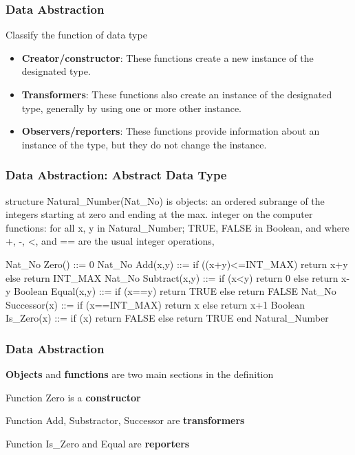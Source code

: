 \documentclass[newPxFont,sthlmFooter,nooffset]{beamer}
\begin{document}
\begin{frame}[t]
	\frametitle{Data Abstraction}
	Classify the function of data type 
	\begin{itemize}
		\item\textbf{Creator/constructor}: These functions create a new instance of the designated type.
		\item\textbf{Transformers}: These functions also create an instance of the designated type, generally by using one or more other instance.
		\item\textbf{Observers/reporters}: These functions provide information about an instance of the type, but they do not change the instance.
	\end{itemize}
	
\end{frame}

\begin{frame}[t, fragile]
  \frametitle{Data Abstraction: Abstract Data Type}
\begin{codedefnb}
structure Natural_Number(Nat_No) is
   objects: an ordered subrange of the integers 
            starting at zero and ending at the max. 
            integer on the computer 
   functions: for all x, y in Natural_Number; 
            TRUE, FALSE in Boolean, 
            and where +, -, <, and == are 
            the usual integer operations,

   Nat_No Zero() ::= 0
   Nat_No Add(x,y) ::= if ((x+y)<=INT_MAX) return x+y
      else return INT_MAX 
   Nat_No Subtract(x,y) ::= if (x<y) return 0
      else return x-y 
   Boolean Equal(x,y) ::= if (x==y) return TRUE
      else return FALSE 
   Nat_No Successor(x) ::= if (x==INT_MAX) return x
      else return x+1 
   Boolean Is_Zero(x) ::= if (x) return FALSE
      else return TRUE
end Natural_Number
\end{codedefnb}
\end{frame}

\begin{frame}[t]
  \frametitle{Data Abstraction}
\textbf{Objects} and \textbf{functions} are two main sections in the definition

Function Zero is a \textbf{constructor} 

Function Add, Substractor, Successor are \textbf{transformers}

Function Is\_Zero and Equal are \textbf{reporters}
\end{frame}
\end{document}
